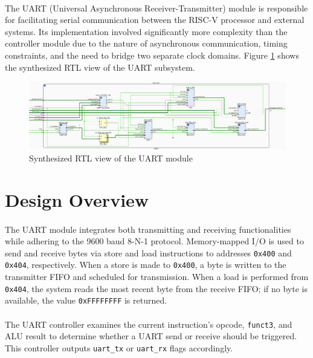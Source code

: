 \documentclass[12pt]{report}
\begin{document}
\paragraph{}
The UART (Universal Asynchronous Receiver-Transmitter) module is responsible for facilitating serial communication between the RISC-V processor and external systems. Its implementation involved significantly more complexity than the controller module due to the nature of asynchronous communication, timing constraints, and the need to bridge two separate clock domains. Figure \ref{fig:uart} shows the synthesized RTL view of the UART subsystem.

\begin{figure}[h]
    \centering
    \includegraphics[width=\textwidth]{figures/uart_rtl.png}
    \caption{Synthesized RTL view of the UART module}
    \label{fig:uart}
\end{figure}

\section{Design Overview}

\paragraph{}
The UART module integrates both transmitting and receiving functionalities while adhering to the 9600 baud 8-N-1 protocol. Memory-mapped I/O is used to send and receive bytes via store and load instructions to addresses \texttt{0x400} and \texttt{0x404}, respectively. When a store is made to \texttt{0x400}, a byte is written to the transmitter FIFO and scheduled for transmission. When a load is performed from \texttt{0x404}, the system reads the most recent byte from the receive FIFO; if no byte is available, the value \texttt{0xFFFFFFFF} is returned.

\paragraph{}
The UART controller examines the current instruction's opcode, \texttt{funct3}, and ALU result to determine whether a UART send or receive should be triggered. This controller outputs \texttt{uart\_tx} or \texttt{uart\_rx} flags accordingly.
\end{document}
